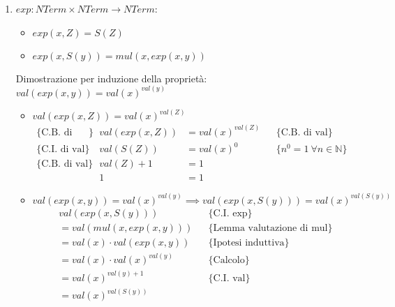 \documentclass{article}
\begin{document}
\begin{enumerate}
    \item \(exp: NTerm \times NTerm \rightarrow NTerm\):
          \begin{itemize}
              \item[\text{[C.B.]}] \(exp(x,Z) = S(Z)\)
              \item[\text{[C.I.]}] \(exp(x, S(y)) = mul(x, exp(x,y))\)
          \end{itemize}
          Dimostrazione per induzione della proprietà: \(val(exp(x,y)) = val(x)^{val(y)}\)
          \begin{itemize}
              \item[\text{[C.B.]}] \(val(exp(x,Z)) = val(x)^{val(Z)}\)
              \begin{align*}
                  \{\text{C.B. di exp}\} &  & val(exp(x,Z)) & = val(x)^{val(Z)} &  & \{\text{C.B. di val}\}                 \\
                  \{\text{C.I. di val}\} &  & val(S(Z))     & = val(x)^0        &  & \{n^0 = 1\ \forall n \in \mathbb{N} \} \\
                  \{\text{C.B. di val}\} &  & val(Z) + 1    & = 1               &  &                                        \\
                                         &  & 1             & = 1               &  &
              \end{align*}
              \item[\text{[P.I.]}] \(val(exp(x,y)) = val(x)^{val(y)} \implies val(exp(x, S(y))) = val(x)^{val(S(y))}\)
              \begin{align*}
                   & val(exp(x, S(y)))              &  & \{\text{C.I. exp}\}                 \\
                   & = val(mul(x, exp(x,y)))        &  & \{\text{Lemma valutazione di mul}\} \\
                   & = val(x) \cdot val(exp(x,y))   &  & \{\text{Ipotesi induttiva}\}        \\
                   & = val(x) \cdot val(x)^{val(y)} &  & \{\text{Calcolo}\}                  \\
                   & = val(x)^{val(y) + 1}          &  & \{\text{C.I. val}\}                 \\
                   & = val(x)^{val(S(y))}
              \end{align*}
          \end{itemize}


\end{enumerate}
\end{document}
